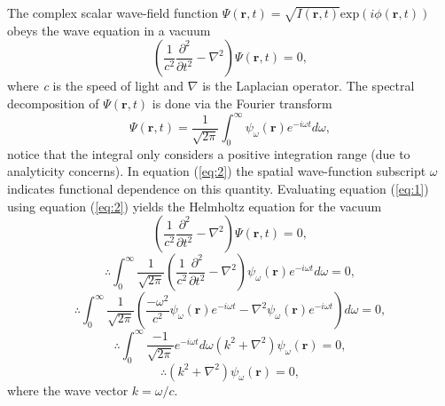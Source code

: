 \documentclass[10pt, a4paper, singlespacing]{report}
\begin{document}
The complex scalar wave-field function $\Psi(\mathbf{r},t) = \sqrt{I(\mathbf{r},t)} \mathrm{exp}(i \phi(\mathbf{r},t))$ obeys the wave equation in a vacuum
\begin{equation}\label{eq:1}
\left ( \frac{1}{c^2} \frac{\partial^2 }{\partial t^2} -\nabla^2 \right ) \Psi(\mathbf{r},t) = 0,
\end{equation} 
where \textit{c} is the speed of light and $\nabla$ is the Laplacian operator.
The spectral decomposition of $\Psi(\mathbf{r},t)$ is done via the Fourier transform
\begin{equation}\label{eq:2}
\Psi(\mathbf{r},t) = \frac{1}{\sqrt{2 \pi}} \int_{0}^{\infty}\psi_{\omega}(\mathbf{r}) e^{-i\omega t}d\omega,
\end{equation}
notice that the integral only considers a positive integration range (due to analyticity concerns\cite{PagsTutes}). In equation (\ref{eq:2}) the spatial wave-function subscript $\omega$ indicates functional dependence on this quantity\cite{Pags2006}. Evaluating equation (\ref{eq:1}) using equation (\ref{eq:2}) yields the Helmholtz equation for the vacuum
\begin{equation}\label{eq:3}
\left ( \frac{1}{c^2}\frac{\partial^2}{\partial t^{2}} - \nabla^{2}  \right )\Psi(\mathbf{r},t) = 0,
\end{equation}
\begin{equation}\label{eq:4}
\therefore \int_{0}^{\infty} \frac{1}{\sqrt{2 \pi}} \left ( \frac{1}{c^2}\frac{\partial^2}{\partial t^{2}} -\nabla^{2}  \right )  
\psi_{\omega}(\mathbf{r}) e^{-i\omega t}d\omega = 0,
\end{equation}
\begin{equation}\label{eq:5}
\therefore \int_{0}^{\infty} \frac{1}{\sqrt{2 \pi}} \left ( \frac{-\omega^2}{c^2}\psi_{\omega}(\mathbf{r}) e^{-i\omega t} -\nabla^{2}\psi_{\omega}(\mathbf{r}) e^{-i\omega t} \right ) d\omega  
 = 0,
\end{equation}
\begin{equation}
\therefore \int_{0}^{\infty} \frac{-1}{\sqrt{2 \pi}} e^{-i\omega t} d\omega \left ( k^2 + \nabla^{2} \right ) \psi_{\omega}(\mathbf{r}) 
 = 0,
\end{equation}
\begin{equation}\label{eq:6}
\therefore \left ( k^2 + \nabla^{2} \right ) \psi_{\omega}(\mathbf{r})  
 = 0,
\end{equation}
where the wave vector $k = \omega/c$.
\end{document}
